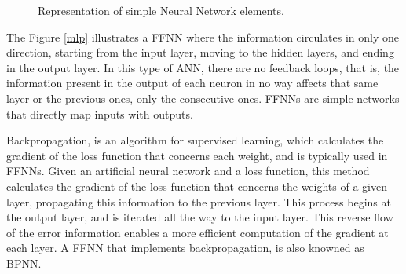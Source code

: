 \begin{figure}[h!]
\captionsetup[subfigure]{position=b}
\centering
{}
\hspace{0.05\textwidth}
\caption{Representation of simple Neural Network elements.}
\end{figure}

The Figure \ref{mlp} illustrates a \ac{FFNN} where the information circulates in only one direction, starting from the input layer, moving to the hidden layers, and ending in the output layer. In this type of \acs{ANN}, there are no feedback loops, that is, the information present in the output of each neuron in no way affects that same layer or the previous ones, only the consecutive ones. \ac{FFNN}s are simple networks that directly map inputs with outputs.

Backpropagation, is an algorithm for supervised learning, which calculates the gradient of the loss function that concerns each weight, and is typically used in \ac{FFNN}s. Given an artificial neural network and a loss function, this method calculates the gradient of the loss function that concerns the weights of a given layer, propagating this information to the previous layer. This process begins at the output layer, and is iterated all the way to the input layer. This reverse flow of the error information enables a more efficient computation of the gradient at each layer. A \ac{FFNN} that implements backpropagation, is also knowned as \ac{BPNN}.



